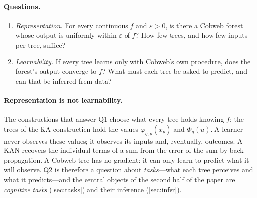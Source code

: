 \documentclass[11pt]{article}
\theoremstyle{definition}
\theoremstyle{remark}
\begin{document}
\paragraph{Questions.}
\begin{enumerate}[label=\textbf{Q\arabic*.},leftmargin=*]
\item \emph{Representation.} For every continuous $f$ and $\varepsilon>0$, is there a
  Cobweb forest whose output is uniformly within $\varepsilon$ of $f$?  How few trees,
  and how few inputs per tree, suffice?
\item \emph{Learnability.} If every tree learns only with Cobweb's own procedure, does
  the forest's output converge to $f$?  What must each tree be asked to predict, and can
  that be inferred from data?
\end{enumerate}

\paragraph{Representation is not learnability.}
The constructions that answer Q1 choose what every tree holds knowing $f$: the trees of
the KA construction hold the values $\varphi_{q,p}(x_p)$ and $\Phi_q(u)$.  A learner never
observes these values; it observes its inputs and, eventually, outcomes.  A KAN recovers
the individual terms of a sum from the error of the sum by back-propagation.  A Cobweb
tree has no gradient: it can only learn to predict what it will observe.  Q2 is
therefore a question about \emph{tasks}---what each tree perceives and what it
predicts---and the central objects of the second half of the paper are \emph{cognitive
tasks} (\cref{sec:tasks}) and their inference (\cref{sec:infer}).
\end{document}

